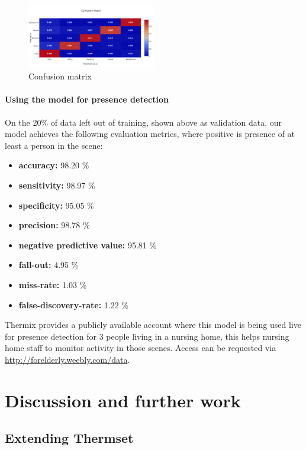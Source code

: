\documentclass[oneside, twocolumn]{article}
\begin{document}
\begin{figure}
  \includegraphics[width=0.5\textwidth]{images/confusion_matrix_42.png}
  \caption{Confusion matrix}
  \label{fig:confusion_matrix_42}
\end{figure}

\paragraph{Using the model for presence detection}
On the 20\% of data left out of training, shown above as validation data, our model  achieves the following evaluation metrics, where positive is presence of at least a person in the scene:

\begin{itemize}
	\item ​\textbf{accuracy:} 98.20 \%
	\item ​\textbf{sensitivity:} 98.97 \%
	\item ​\textbf{specificity:} 95.05 \%
	\item ​\textbf{precision:} 98.78 \%
	\item ​\textbf{negative predictive value:} 95.81 \%
	\item ​\textbf{fall-out:} 4.95 \%
	\item ​\textbf{miss-rate:} 1.03 \%
	\item ​\textbf{false-discovery-rate:} 1.22 \%
\end{itemize}

Thermix provides a publicly available account where this model is being used live for presence detection for 3 people living in a nursing home, this helps nursing home staff to monitor activity in those scenes. Access can be requested via \url{http://forelderly.weebly.com/data}.


\section{Discussion and further work}

\subsection{Extending Thermset}
\end{document}
